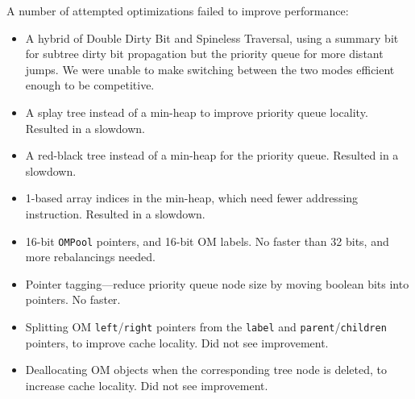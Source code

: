 A number of attempted optimizations
  failed to improve performance:
\begin{itemize}
\item A hybrid of Double Dirty Bit and Spineless Traversal,
    using a summary bit for subtree dirty bit propagation
    but the priority queue for more distant jumps.
  We were unable to make switching between the two modes
    efficient enough to be competitive.
\item A splay tree instead of a min-heap to improve priority queue locality.
  Resulted in a slowdown.
\item A red-black tree instead of a min-heap for the priority queue.
  Resulted in a slowdown.
\item 1-based array indices in the min-heap,
  which need fewer addressing instruction.
  Resulted in a slowdown.
\item 16-bit \texttt{OMPool} pointers, and 16-bit OM labels.
  No faster than 32 bits, and more rebalancings needed.
\item Pointer tagging---reduce priority queue node size
  by moving boolean bits into pointers. No faster.
\item Splitting OM \texttt{left}/\texttt{right} pointers
  from the \texttt{label} and \texttt{parent}/\texttt{children} pointers, to improve cache locality. Did not see improvement.
\item Deallocating OM objects when the corresponding tree node is deleted, to increase cache locality. Did not see improvement.
\end{itemize}